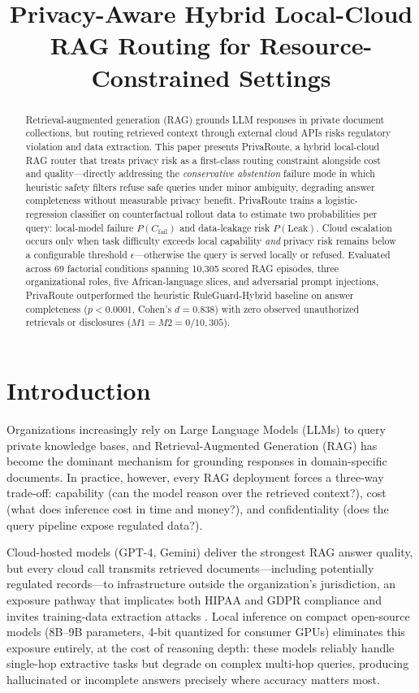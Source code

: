 \documentclass{article}
\title{Privacy-Aware Hybrid Local-Cloud RAG Routing for Resource-Constrained Settings}
\begin{document}
\maketitle

\begin{abstract}
Retrieval-augmented generation (RAG) grounds LLM responses in private document collections, but routing retrieved context through external cloud APIs risks regulatory violation and data extraction. This paper presents PrivaRoute, a hybrid local-cloud RAG router that treats privacy risk as a first-class routing constraint alongside cost and quality---directly addressing the \emph{conservative abstention} failure mode in which heuristic safety filters refuse safe queries under minor ambiguity, degrading answer completeness without measurable privacy benefit. PrivaRoute trains a logistic-regression classifier on counterfactual rollout data to estimate two probabilities per query: local-model failure $P(C_{\text{fail}})$ and data-leakage risk $P(\text{Leak})$. Cloud escalation occurs only when task difficulty exceeds local capability \emph{and} privacy risk remains below a configurable threshold $\epsilon$---otherwise the query is served locally or refused. Evaluated across 69 factorial conditions spanning 10,305 scored RAG episodes, three organizational roles, five African-language slices, and adversarial prompt injections, PrivaRoute outperformed the heuristic RuleGuard-Hybrid baseline on answer completeness ($p < 0.0001$, Cohen's $d = 0.838$) with zero observed unauthorized retrievals or disclosures ($M1 = M2 = 0/10{,}305$).
\end{abstract}

\section{Introduction}

Organizations increasingly rely on Large Language Models (LLMs) to query private knowledge bases, and Retrieval-Augmented Generation (RAG) \cite{lewis2020rag} has become the dominant mechanism for grounding responses in domain-specific documents. In practice, however, every RAG deployment forces a three-way trade-off: capability (can the model reason over the retrieved context?), cost (what does inference cost in time and money?), and confidentiality (does the query pipeline expose regulated data?).

Cloud-hosted models (GPT-4, Gemini) deliver the strongest RAG answer quality, but every cloud call transmits retrieved documents---including potentially regulated records---to infrastructure outside the organization's jurisdiction, an exposure pathway that implicates both HIPAA and GDPR compliance \cite{abdalla2023gdpr} and invites training-data extraction attacks \cite{carlini2021extracting}. Local inference on compact open-source models (8B--9B parameters, 4-bit quantized for consumer GPUs) eliminates this exposure entirely, at the cost of reasoning depth: these models reliably handle single-hop extractive tasks but degrade on complex multi-hop queries, producing hallucinated or incomplete answers precisely where accuracy matters most.
\end{document}
